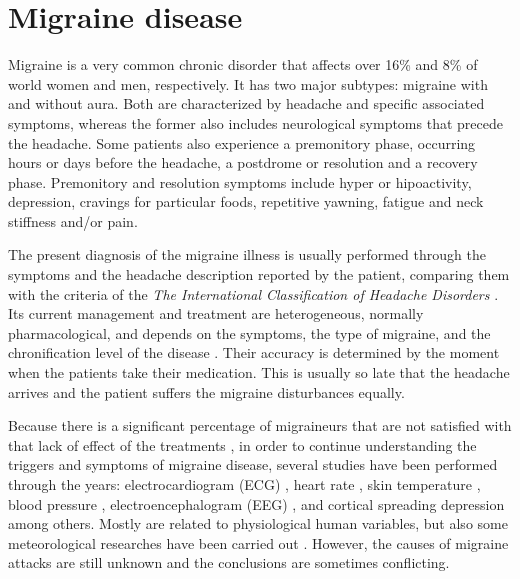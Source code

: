 \label{chapter:stateofart} 

\section{Migraine disease}

Migraine is a very common chronic disorder that affects over 16\% and 8\% of world women and men, respectively. It has two major subtypes: migraine with and without aura. Both are characterized by headache and specific associated symptoms, whereas the former also includes neurological symptoms that precede the headache. Some patients also experience a premonitory phase, occurring hours or days before the headache, a postdrome or resolution and a recovery phase. Premonitory and resolution symptoms include hyper or hipoactivity, depression, cravings for particular foods, repetitive yawning, fatigue and neck stiffness and/or pain.


The present diagnosis of the migraine illness is usually performed through the symptoms and the headache description reported by the patient, comparing them with the criteria of the \emph{The International Classification of Headache Disorders} \cite{pmid23771276}. Its current management and treatment are heterogeneous, normally pharmacological, and depends on the symptoms, the type of migraine, and the chronification level of the disease \cite{diener2012chronic, hershey2010current, silberstein2012safety, guglielmo2013possible, lopes2012concepts}. Their accuracy is determined by the moment when the patients take their medication. This is usually so late that the headache arrives and the patient suffers the migraine disturbances equally.


Because there is a significant percentage of migraineurs that are not satisfied with that lack of effect of the treatments \cite{smelt2014patients,HEAD:HEAD1867}, in order to continue understanding the triggers and symptoms of migraine disease, several studies have been performed through the years: electrocardiogram (ECG) \cite{melek2007autonomic, aygun2003electrocardiographic}, heart rate \cite{pmid23853566, pmid19925627}, skin temperature \cite{zaproudina2013acral, ordas2013increase}, blood pressure \cite{pietrini2005hypertension, pmid19925627}, electroencephalogram (EEG)  \cite{bjork2011initiates, walker2011qeeg}, and cortical spreading depression  \cite{charles2013cortical} among others. Mostly are related to physiological human variables, but also some meteorological researches have been carried out \cite{bolay2011does, friedman2009migraine, prince2004effect}. However, the causes of migraine attacks are still unknown and the conclusions are sometimes conflicting.


